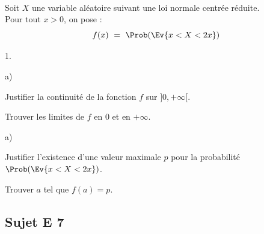 \documentclass[11pt]{article}%
\begin{document}
\begin{exerciceSP}~\\
  Soit $X$ une variable aléatoire suivant une loi normale centrée
  réduite.\\
  Pour tout $x>0$, on pose :
  \[
    f(x) \ = \ \Prob(\Ev{x < X < 2x})
  \]
  \begin{noliste}{1.}
  \item
    \begin{noliste}{a)}
    \item Justifier la continuité de la fonction $f$ sur $]0,+\infty[$.
      
    \item Trouver les limites de $f$ en $0$ et en $+\infty$.
    \end{noliste}
    
  \item
    \begin{noliste}{a)}
    \item Justifier l'existence d'une valeur maximale $p$ pour la
      probabilité $\Prob(\Ev{x < X < 2x})$.
      
    \item Trouver $a$ tel que $f(a) = p$.
    \end{noliste}
  \end{noliste}
\end{exerciceSP}


\newpage


\subsection*{Sujet E 7}
\end{document}

